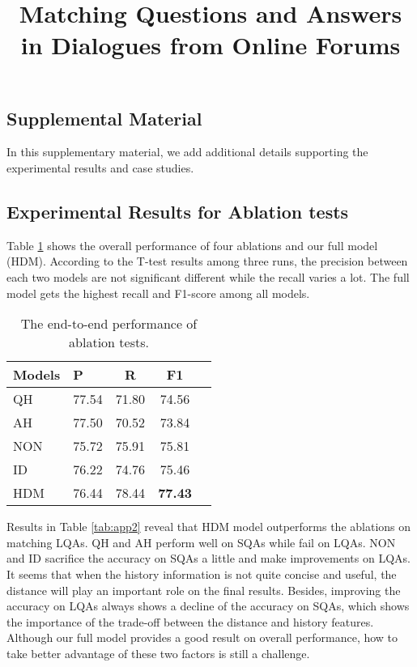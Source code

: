 \documentclass[letterpaper]{article} %
\title{Matching Questions and Answers in Dialogues from Online Forums}
\begin{document}
\maketitle

\begin{CJK}{UTF8}{gbsn}
	\section{Supplemental Material}
	\label{sec:appendix}
	
	In this supplementary material, we add additional details supporting the experimental results and case studies.
	
	\subsection{Experimental Results for Ablation tests}
	
	Table \ref{tab:app1} shows the overall performance of four ablations and our full model (HDM). According to the T-test results among three runs, the precision between each two models are not significant different while the recall varies a lot. The full model gets the highest recall and F1-score among all models.
	
	\begin{table}[h]
		\small
		\centering
		\begin{tabular}{p{1cm}<{\centering}p{1cm}<{\centering}ccc}
			\toprule[1.5pt]
			Models &P&R& F1\\
			\midrule[1pt]
			QH&77.54&71.80&74.56\\
			AH&77.50&70.52&73.84\\
			\hline
			NON&75.72&75.91&75.81\\
			ID&76.22&74.76&75.46\\
			\hline
			HDM&76.44&78.44&\textbf{77.43}\\
			\bottomrule[1.5pt]
		\end{tabular}
		\caption{The end-to-end performance of ablation tests.}
		\label{tab:app1}
	\end{table}
	
	Results in Table \ref{tab:app2} reveal that HDM model outperforms the ablations on matching LQAs. QH and AH perform well on SQAs while fail on LQAs. NON and ID sacrifice the accuracy on SQAs a little and make improvements on LQAs. It seems that when the history information is not quite concise and useful, the distance will play an important role on the final results. Besides, improving the accuracy on LQAs always shows a decline of the accuracy on SQAs, which shows the importance of the trade-off between the distance and history features. Although our full model provides a good result on overall performance, how to take better advantage of these two factors is still a challenge.
	

\end{CJK}
\end{document}
